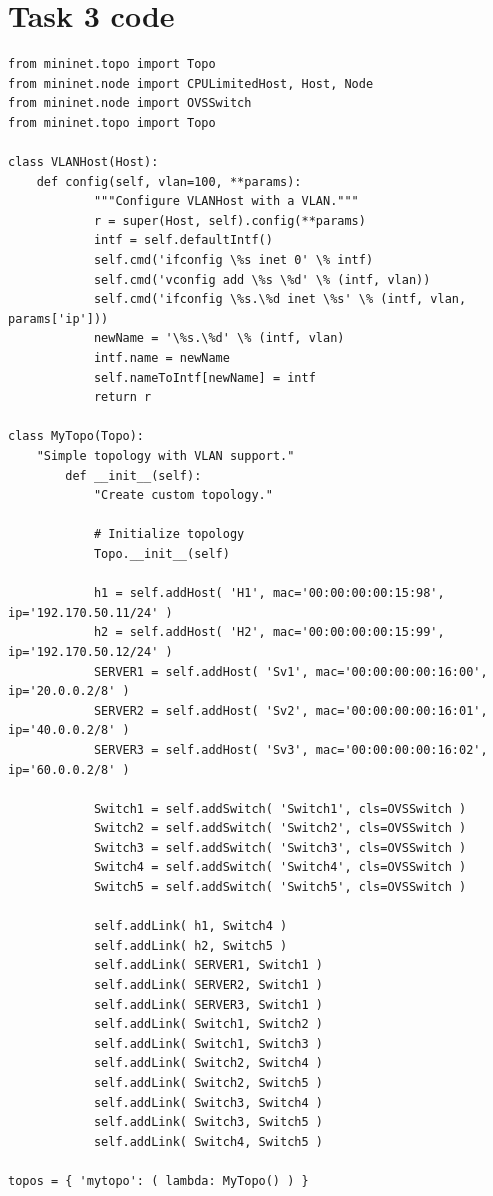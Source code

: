 \documentclass{article}
\begin{document}
\section{Task 3 code}
\begin{lstlisting}
from mininet.topo import Topo  
from mininet.node import CPULimitedHost, Host, Node
from mininet.node import OVSSwitch
from mininet.topo import Topo

class VLANHost(Host):
	def config(self, vlan=100, **params):
        	"""Configure VLANHost with a VLAN."""
        	r = super(Host, self).config(**params)
        	intf = self.defaultIntf()
        	self.cmd('ifconfig \%s inet 0' \% intf)
        	self.cmd('vconfig add \%s \%d' \% (intf, vlan))
        	self.cmd('ifconfig \%s.\%d inet \%s' \% (intf, vlan, params['ip']))
        	newName = '\%s.\%d' \% (intf, vlan)
        	intf.name = newName
        	self.nameToIntf[newName] = intf
        	return r

class MyTopo(Topo):  
	"Simple topology with VLAN support."
    	def __init__(self):
        	"Create custom topology."

	        # Initialize topology
	        Topo.__init__(self)

	        h1 = self.addHost( 'H1', mac='00:00:00:00:15:98', ip='192.170.50.11/24' )
	        h2 = self.addHost( 'H2', mac='00:00:00:00:15:99', ip='192.170.50.12/24' )
	        SERVER1 = self.addHost( 'Sv1', mac='00:00:00:00:16:00', ip='20.0.0.2/8' )
	        SERVER2 = self.addHost( 'Sv2', mac='00:00:00:00:16:01', ip='40.0.0.2/8' )
	        SERVER3 = self.addHost( 'Sv3', mac='00:00:00:00:16:02', ip='60.0.0.2/8' )

	        Switch1 = self.addSwitch( 'Switch1', cls=OVSSwitch )
	        Switch2 = self.addSwitch( 'Switch2', cls=OVSSwitch )
	        Switch3 = self.addSwitch( 'Switch3', cls=OVSSwitch )
	        Switch4 = self.addSwitch( 'Switch4', cls=OVSSwitch )
	        Switch5 = self.addSwitch( 'Switch5', cls=OVSSwitch )

	        self.addLink( h1, Switch4 )
	        self.addLink( h2, Switch5 )
	        self.addLink( SERVER1, Switch1 )
	        self.addLink( SERVER2, Switch1 )
	        self.addLink( SERVER3, Switch1 )
	        self.addLink( Switch1, Switch2 )
	        self.addLink( Switch1, Switch3 )
	        self.addLink( Switch2, Switch4 )
	        self.addLink( Switch2, Switch5 )
	        self.addLink( Switch3, Switch4 )
	        self.addLink( Switch3, Switch5 )
	        self.addLink( Switch4, Switch5 )

topos = { 'mytopo': ( lambda: MyTopo() ) }
\end{lstlisting}
\end{document}
